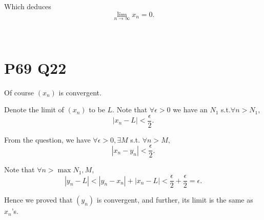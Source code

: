 \documentclass[12pt]{article}%
\begin{document}
Which deduces $$\lim_{n \to \infty}x_n=0.$$

~\

\section{P69 Q22}
Of course $(x_n)$ is convergent.

Denote the limit of $(x_n)$ to be $L.$ Note that $\forall \epsilon>0$ we have an $N_1$ s.t.$\forall n>N_1$, $$|x_n-L|<\frac{\epsilon}{2}.$$ 

From the question, we have $\forall \epsilon>0,\exists M$ s.t. $\forall n>M,$ $$|x_n-y_n|<\frac{\epsilon}{2}.$$

Note that $\forall n>\max{N_1,M}$, $$|y_n-L|<|y_n-x_n|+|x_n-L|<\frac{\epsilon}{2}+\frac{\epsilon}{2}=\epsilon.$$

Hence we proved that $(y_n)$ is convergent, and further, its limit is the same as $x_n$'s. 
\end{document}

